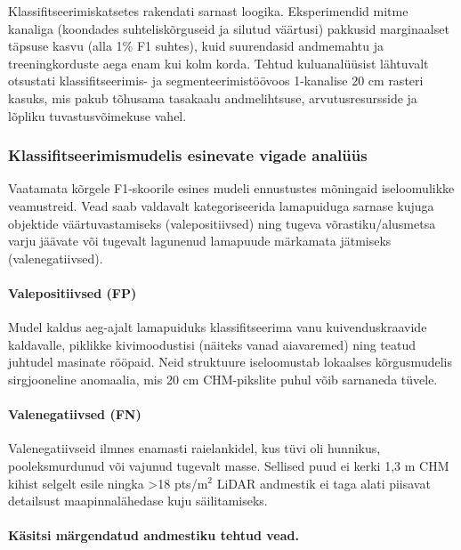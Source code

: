 Klassifitseerimiskatsetes rakendati sarnast loogika. Eksperimendid mitme kanaliga (koondades suhteliskõrguseid ja silutud väärtusi) pakkusid marginaalset täpsuse kasvu (alla 1\% F1 suhtes), kuid suurendasid andmemahtu ja treeningkorduste aega enam kui kolm korda. Tehtud kuluanalüüsist lähtuvalt otsustati klassifitseerimis- ja segmenteerimistöövoos 1-kanalise 20 cm rasteri kasuks, mis pakub tõhusama tasakaalu andmelihtsuse, arvutusresursside ja lõpliku tuvastusvõimekuse vahel.

\subsubsection{Klassifitseerimismudelis esinevate vigade analüüs}
\label{klassifitseerimise-vigade-analüüs}

Vaatamata kõrgele F1-skoorile esines mudeli ennustustes mõningaid iseloomulikke veamustreid. Vead saab valdavalt kategoriseerida lamapuiduga sarnase kujuga objektide väärtuvastamiseks (valepositiivsed) ning tugeva võrastiku/alusmetsa varju jäävate või tugevalt lagunenud lamapuude märkamata jätmiseks (valenegatiivsed).

\paragraph{Valepositiivsed (FP)} Mudel kaldus aeg-ajalt lamapuiduks klassifitseerima vanu kuivenduskraavide kaldavalle, piklikke kivimoodustisi (näiteks vanad aiavaremed) ning teatud juhtudel masinate rööpaid. Neid struktuure iseloomustab lokaalses kõrgusmudelis sirgjooneline anomaalia, mis 20 cm CHM-pikslite puhul võib sarnaneda tüvele.

\paragraph{Valenegatiivsed (FN)} Valenegatiivseid ilmnes enamasti raielankidel, kus tüvi oli hunnikus, pooleksmurdunud või vajunud tugevalt masse. Sellised puud ei kerki 1,3 m CHM kihist selgelt esile ningka  >18 pts/m$^2$ LiDAR andmestik ei taga alati piisavat detailsust maapinnalähedase kuju säilitamiseks.


\paragraph{Käsitsi märgendatud andmestiku tehtud vead.}

